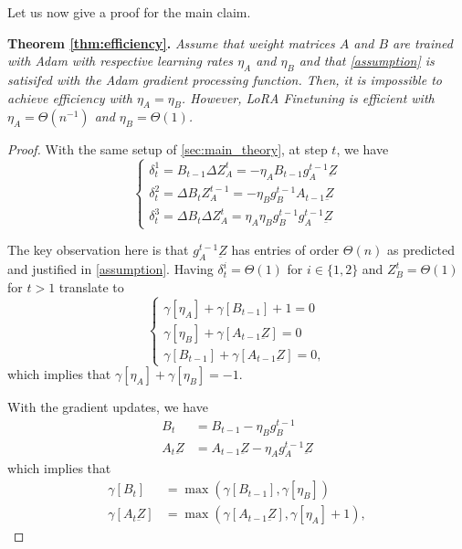 Let us now give a proof for the main claim. 

\textbf{Theorem \ref{thm:efficiency}.}
\emph{Assume that weight matrices $A$ and $B$ are trained with Adam with respective learning rates $\eta_A$ and $\eta_B$ and that \cref{assumption} is satisifed with the Adam gradient processing function. Then, it is impossible to achieve efficiency with $\eta_A = \eta_B$. However, LoRA Finetuning is efficient with $\eta_A = \Theta(n^{-1})$ and $\eta_B = \Theta(1)$.}\\


\begin{proof}

With the same setup of \cref{sec:main_theory}, at step $t$, we have 
\begin{equation*}
    \begin{cases}
        \delta_t^1 = B_{t-1} \Delta Z_A^t  = -\eta_A B_{t-1} g^{t-1}_A \underbar{Z}\\
        \delta_t^2 = \Delta B_t Z_A^{t-1} = -\eta_B g^{t-1}_B A_{t-1} \underbar{Z}\\
        \delta_t^3 = \Delta B_t \Delta Z_A^t = \eta_A \eta_B g^{t-1}_B g^{t-1}_A \underbar{Z}
    \end{cases}
\end{equation*}

The key observation here is that $g^{t-1}_A \underbar{Z}$ has entries of order $\Theta(n)$ as predicted and justified in \cref{assumption}. Having $\delta^i_t = \Theta(1)$ for $i \in \{1,2\}$ and $Z_B^t = \Theta(1)$ for $t >1$ translate to 
\begin{equation*}
\begin{cases}
    \gamma[\eta_A] + \gamma[B_{t-1}]+1  = 0\\
    \gamma[\eta_B] + \gamma[A_{t-1} \underbar{Z}] = 0\\
    \gamma[B_{t-1}] + \gamma[A_{t-1} \underbar{Z}] = 0,
\end{cases}
\end{equation*}
which implies that $\gamma[\eta_A] + \gamma[\eta_B] = -1$.

With the gradient updates, we have 
\begin{align*}
    B_t &= B_{t-1} - \eta_B g^{t-1}_B\\
    A_t \underbar{Z} &= A_{t-1}\underbar{Z} - \eta_A g^{t-1}_A \underbar{Z}
\end{align*}
which implies that 
\begin{align*}
    \gamma[B_t] &= \max(\gamma[B_{t-1}], \gamma[\eta_B])\\
    \gamma[A_t \underbar{Z}] &= \max(\gamma[A_{t-1} \underbar{Z}], \gamma[\eta_A]+1),
\end{align*}



\end{proof}
